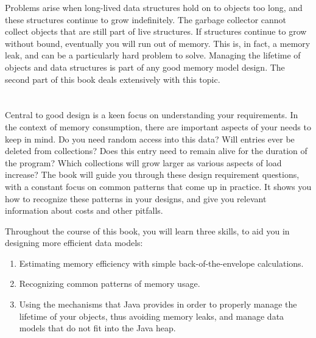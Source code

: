 Problems arise when long-lived data
structures hold on to objects too long, and these structures continue to grow
indefinitely. The garbage collector cannot collect objects that are still part
of live structures. If structures continue to grow without bound, eventually you
will run out of memory. This is, in fact, a memory leak, and can be a
particularly hard problem to solve. Managing the lifetime of objects and data
structures is part of any good memory model design. The second part of this book
deals extensively with this topic.

\section{\thetitle}



Central to good design is a keen focus on understanding your requirements.
In the context of memory consumption, there are important aspects of your needs
to keep in mind. Do you need random access into this data? Will entries ever be
deleted from collections? Does this entry need to remain alive for the duration
of the program? Which collections will grow larger as various aspects of load
increase? The book will guide you through these design requirement questions,
with a constant focus on common patterns that come up in practice. It shows you
how to recognize these patterns in your designs, and give you relevant
information about costs and other pitfalls.

Throughout the course of this book, you will learn three skills, to aid you in
designing more efficient data models:
\begin{enumerate}
  \item Estimating memory efficiency with simple back-of-the-envelope
  calculations.
  \item Recognizing common patterns of memory usage.
  \item Using the mechanisms that Java provides in order to properly manage the
  lifetime of your objects, thus avoiding memory leaks, and manage data models
  that do not fit into the Java heap.
\end{enumerate} 

